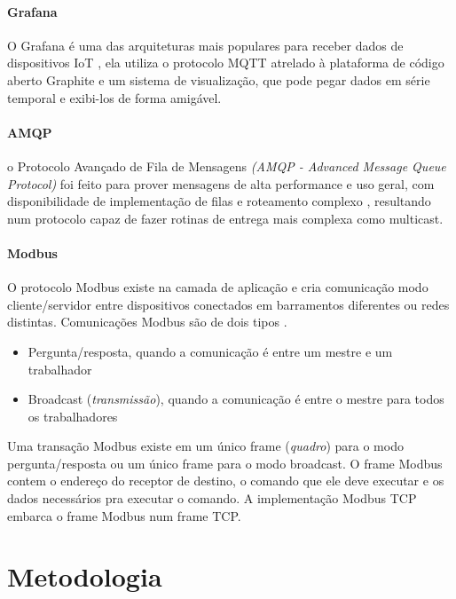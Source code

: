 \documentclass[tcc,capa]{texufpel}
\begin{document}
\subsubsection{Grafana}

O Grafana é uma das arquiteturas mais populares para receber dados de dispositivos IoT \cite{schiller}, ela utiliza o protocolo MQTT atrelado à plataforma de código aberto Graphite e um sistema de visualização, que pode pegar dados em série temporal e exibi-los de forma amigável.

\subsubsection{AMQP}

o Protocolo Avançado de Fila de Mensagens \textit{(AMQP - Advanced Message Queue Protocol)} foi feito para prover mensagens de alta performance e uso geral, com disponibilidade de implementação de filas e roteamento complexo \cite{o2007toward}, resultando num protocolo capaz de fazer rotinas de entrega mais complexa como multicast.

\subsubsection{Modbus}

O protocolo Modbus existe na camada de aplicação e cria comunicação modo cliente/servidor entre dispositivos conectados em barramentos diferentes ou redes distintas. Comunicações
Modbus são de dois tipos \cite{fovino2009design}.
\begin{itemize}
        \item Pergunta/resposta, quando a comunicação é entre um mestre e um trabalhador
        \item Broadcast (\textit{transmissão}), quando a comunicação é entre o mestre para todos os trabalhadores
\end{itemize}

Uma transação Modbus existe em um único frame (\textit{quadro}) para o modo pergunta/resposta ou um único frame para o modo broadcast. O frame Modbus contem o endereço do receptor
de destino, o comando que ele deve executar e os dados necessários pra executar o comando. A implementação Modbus TCP embarca o frame Modbus num frame TCP.

\chapter{Metodologia}
\end{document}
